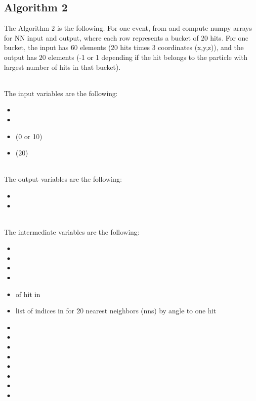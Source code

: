 \subsection{Algorithm 2}

The Algorithm 2 is the following. For one event, from  and  compute numpy arrays for NN input and output, where each row represents a bucket of 20 hits. For one bucket, the input has 60 elements (20 hits times 3 coordinates (x,y,z)), and the output has 20 elements (-1 or 1 depending if the hit belongs to the particle with largest number of hits in that bucket).

\ \\ The input variables are the following:
\begin{itemize}
\item {}
\item {}
\item {} (0 or 10)
\item {} (20)
\end{itemize}

\ \\ The output variables are the following:
\begin{itemize} 
\item {}
\item {}
\end{itemize}

\ \\ The intermediate variables are the following:
\begin{itemize} 
\item {}
\item {}
\item {}
\item {}
\item {} of hit in 
\item {} list of indices in  for 20 nearest neighbors (nns) by angle to one hit
\item {}
\item {}
\item {}
\item {}
\item {}
\item {}
\item {}
\item {}
\end{itemize}

